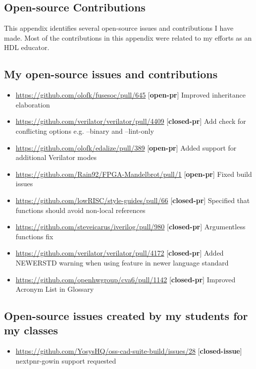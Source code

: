 
\begin{appendices}

\chapter{Open-source Contributions}
\label{appx:contributions}

This appendix identifies several open-source issues and contributions I have made. Most of the contributions in this appendix were related to my efforts as an HDL educator.

\section{My open-source issues and contributions}

\begin{itemize}
    \item \url{https://github.com/olofk/fusesoc/pull/645} [\textbf{open-pr}] Improved inheritance elaboration
    \item \url{https://github.com/verilator/verilator/pull/4409} [\textbf{closed-pr}] Add check for conflicting options e.g. --binary and --lint-only
    \item \url{https://github.com/olofk/edalize/pull/389} [\textbf{open-pr}] Added support for additional Verilator modes
    \item \url{https://github.com/Rain92/FPGA-Mandelbrot/pull/1} [\textbf{open-pr}] Fixed build issues
    \item \url{https://github.com/lowRISC/style-guides/pull/66} [\textbf{closed-pr}] Specified that functions should avoid non-local references
    \item \url{https://github.com/steveicarus/iverilog/pull/980} [\textbf{closed-pr}] Argumentless functions fix
    \item \url{https://github.com/verilator/verilator/pull/4172} [\textbf{closed-pr}] Added NEWERSTD warning when using feature in newer language standard
    \item \url{https://github.com/openhwgroup/cva6/pull/1142} [\textbf{closed-pr}] Improved Acronym List in Glossary
\end{itemize}

\section{Open-source issues created by my students for my classes}

\begin{itemize}
    \item \url{https://github.com/YosysHQ/oss-cad-suite-build/issues/28} [\textbf{closed-issue}] nextpnr-gowin support requested
\end{itemize}


\end{appendices}
